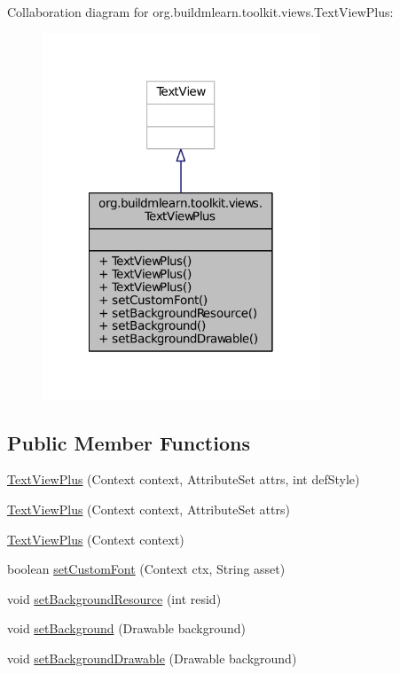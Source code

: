 Collaboration diagram for org.\-buildmlearn.\-toolkit.\-views.\-Text\-View\-Plus\-:
\nopagebreak
\begin{figure}[H]
\begin{center}
\leavevmode
\includegraphics[width=234pt]{d3/d4a/classorg_1_1buildmlearn_1_1toolkit_1_1views_1_1TextViewPlus__coll__graph}
\end{center}
\end{figure}
\subsection*{Public Member Functions}
\begin{DoxyCompactItemize}
\item 
\hyperlink{classorg_1_1buildmlearn_1_1toolkit_1_1views_1_1TextViewPlus_a7fa4bf12efffc541314f6eb6b14503d4}{Text\-View\-Plus} (Context context, Attribute\-Set attrs, int def\-Style)
\item 
\hyperlink{classorg_1_1buildmlearn_1_1toolkit_1_1views_1_1TextViewPlus_aca058cffb6db170aaa914b82f91b674b}{Text\-View\-Plus} (Context context, Attribute\-Set attrs)
\item 
\hyperlink{classorg_1_1buildmlearn_1_1toolkit_1_1views_1_1TextViewPlus_ae6712af05da2664bb1712ef7bd204e23}{Text\-View\-Plus} (Context context)
\item 
boolean \hyperlink{classorg_1_1buildmlearn_1_1toolkit_1_1views_1_1TextViewPlus_ac99922a7826fdc49ff01d24d4c706b35}{set\-Custom\-Font} (Context ctx, String asset)
\item 
void \hyperlink{classorg_1_1buildmlearn_1_1toolkit_1_1views_1_1TextViewPlus_a0d52d41fd4c9baf6e949c72e7c3f9603}{set\-Background\-Resource} (int resid)
\item 
void \hyperlink{classorg_1_1buildmlearn_1_1toolkit_1_1views_1_1TextViewPlus_af52318bfe2778c95e9b2565999842079}{set\-Background} (Drawable background)
\item 
void \hyperlink{classorg_1_1buildmlearn_1_1toolkit_1_1views_1_1TextViewPlus_a4739d5c108dd898bd6d250bfa9a7f893}{set\-Background\-Drawable} (Drawable background)
\end{DoxyCompactItemize}


